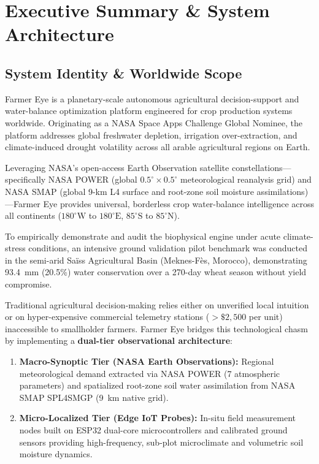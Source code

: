 \documentclass[11pt,a4paper,oneside]{report}
\begin{document}
\tableofcontents
\newpage

\chapter{Executive Summary \& System Architecture}

\section{System Identity \& Worldwide Scope}
Farmer Eye is a planetary-scale autonomous agricultural decision-support and water-balance optimization platform engineered for crop production systems worldwide. Originating as a NASA Space Apps Challenge Global Nominee, the platform addresses global freshwater depletion, irrigation over-extraction, and climate-induced drought volatility across all arable agricultural regions on Earth.

Leveraging NASA's open-access Earth Observation satellite constellations—specifically NASA POWER (global $0.5^\circ \times 0.5^\circ$ meteorological reanalysis grid) and NASA SMAP (global 9-km L4 surface and root-zone soil moisture assimilations)—Farmer Eye provides universal, borderless crop water-balance intelligence across all continents ($180^\circ\text{W}$ to $180^\circ\text{E}$, $85^\circ\text{S}$ to $85^\circ\text{N}$).

To empirically demonstrate and audit the biophysical engine under acute climate-stress conditions, an intensive ground validation pilot benchmark was conducted in the semi-arid Saïss Agricultural Basin (Meknes-Fès, Morocco), demonstrating 93.4~mm (20.5\%) water conservation over a 270-day wheat season without yield compromise.

Traditional agricultural decision-making relies either on unverified local intuition or on hyper-expensive commercial telemetry stations ($> \$2,500$ per unit) inaccessible to smallholder farmers. Farmer Eye bridges this technological chasm by implementing a \textbf{dual-tier observational architecture}:
\begin{enumerate}[leftmargin=*]
    \item \textbf{Macro-Synoptic Tier (NASA Earth Observations):} Regional meteorological demand extracted via NASA POWER (7 atmospheric parameters) and spatialized root-zone soil water assimilation from NASA SMAP SPL4SMGP (9~km native grid).
    \item \textbf{Micro-Localized Tier (Edge IoT Probes):} In-situ field measurement nodes built on ESP32 dual-core microcontrollers and calibrated ground sensors providing high-frequency, sub-plot microclimate and volumetric soil moisture dynamics.
\end{enumerate}
\end{document}
